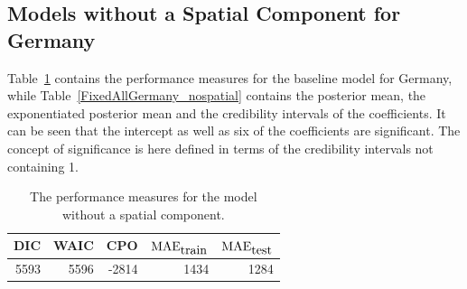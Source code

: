 \subsection{Models without a Spatial Component for Germany}\label{sec:nospatial_germany}
Table~\ref{allGermany_nospatial} contains the performance measures for the baseline model for Germany, while Table~\ref{FixedAllGermany_nospatial} contains the posterior mean, the exponentiated posterior mean and the credibility intervals of the coefficients. It can be seen that the intercept as well as six of the coefficients are significant. The concept of significance is here defined in terms of the credibility intervals not containing 1.
\begin{table}[H] 
\caption{The performance measures for the model without a spatial component. \label{allGermany_nospatial}}
\begin{tabular}{r r r r r}
\toprule
\textbf{DIC}	& \textbf{WAIC} & \textbf{CPO} & \textbf{$\hbox{MAE}_{\hbox{train}}$} & \textbf{$\hbox{MAE}_{\hbox{test}}$}\\
\midrule
5593 & 5596 & -2814 & 1434 & 1284 \\
\bottomrule
\end{tabular}
\end{table}
